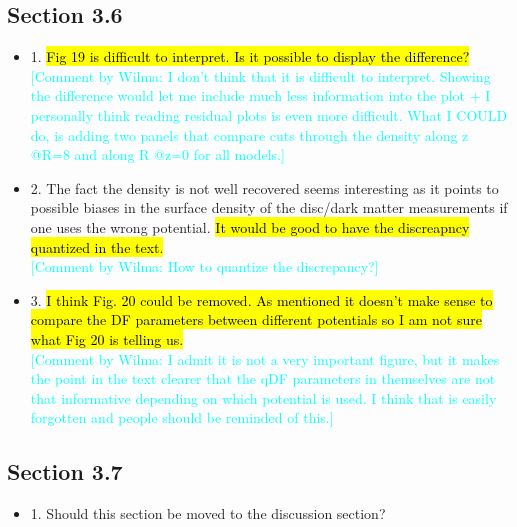 \documentclass[10pt,a4paper]{article}
\newcommand{\HW}[1]{\textcolor{Cyan}{#1}}
\begin{document}
\subsection{Section 3.6}
\begin{itemize}
\item 1. \hl{Fig 19 is difficult to interpret. Is it possible to display the difference?}\\\HW{[Comment by Wilma: I don't think that it is difficult to interpret. Showing the difference would let me include much less information into the plot + I personally think reading residual plots is even more difficult. What I COULD do, is adding two panels that compare cuts through the density along z @R=8 and along R @z=0 for all models.]}
\item 2. The fact the density is not well recovered seems interesting as it points to possible biases in the surface density of the disc/dark matter measurements if one uses the wrong potential. \hl{It would be good to have the discreapncy quantized in the text.}\\\HW{[Comment by Wilma: How to quantize the discrepancy?]}
\item 3. \hl{I think Fig. 20 could be removed. As mentioned it doesn't make sense to compare the DF parameters between different potentials so I am not sure what Fig 20 is telling us.}\\\HW{[Comment by Wilma: I admit it is not a very important figure, but it makes the point in the text clearer that the qDF parameters in themselves are not that informative depending on which potential is used. I think that is easily forgotten and people should be reminded of this.]}
\end{itemize}

\subsection{Section 3.7}
\begin{itemize}
\item 1. Should this section be moved to the discussion section?
\end{itemize}
\end{document}
